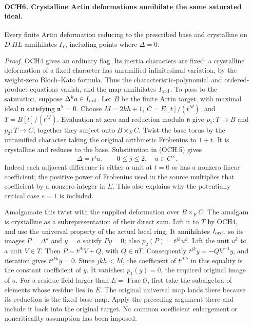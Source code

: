 \paragraph{OCH6. Crystalline Artin deformations annihilate the same saturated ideal.}
\label{claim:OCH6}
Every finite Artin deformation reducing to the prescribed base and
crystalline on \(D.HL\) annihilates \(I_Y\), including points
where \(\Delta=0\).

\emph{Proof.}
OCH4 gives an ordinary flag.  Its inertia characters are fixed:
a crystalline deformation of a fixed character has unramified
infinitesimal variation, by the weight-zero Bloch--Kato formula.
Thus the characteristic-polynomial and ordered-product equations
vanish, and the map annihilates \(I_{\rm ord}\).
To pass to the saturation, suppose \(\Delta^k a\in I_{\rm ord}\).
Let \(B\) be the finite Artin target, with maximal ideal
\(\mathfrak n\) satisfying \(\mathfrak n^h=0\).
Choose \(M=2kh+1\),
\(C=E[t]/(t^M)\), and \(T=B[t]/(t^M)\).
Evaluation at zero and reduction modulo \(\mathfrak n\) give
\(p_1:T\to B\) and \(p_2:T\to C\); together they surject onto
\(B\times_E C\).
Twist the base torus by the unramified character taking the original
arithmetic Frobenius to \(1+t\).  It is crystalline and reduces
to the base.  Substitution in (OCH.5) gives
\[
                   \Delta=t^j u,\qquad 0\le j\le2,
                       \quad u\in C^\times.
 \tag{OCH.6}
\]
Indeed each adjacent difference is either a unit at \(t=0\)
or has a nonzero linear coefficient; the positive power of
Frobenius used in the source multiplies that coefficient by a
nonzero integer in \(E\).  This also explains why the potentially
critical case \(e=1\) is included.

Amalgamate this twist with the supplied deformation over
\(B\times_E C\).  The amalgam is crystalline as a
subrepresentation of their direct sum.  Lift it to \(T\) by
OCH4, and use the universal property of the actual local ring.
It annihilates \(I_{\rm ord}\), so its images \(P=\Delta^k\)
and \(y=a\) satisfy \(Py=0\); also
\(p_2(P)=t^{jk}u^k\).  Lift the unit \(u^k\) to a unit
\(V\in T\).  Then \(P=t^{jk}V+Q\), with
\(Q\in\mathfrak nT\).  Consequently
\(t^{jk}y=-QV^{-1}y\), and iteration gives
\(t^{jkh}y=0\).  Since \(jkh<M\), the coefficient of
\(t^{jkh}\) in this equality is the constant coefficient of
\(y\).  It vanishes: \(p_1(y)=0\), the required original
image of \(a\).
For a residue field larger than \(E=\operatorname{Frac}\mathcal O\),
first take the subalgebra of elements whose residue lies in \(E\).
The original universal map lands there because its reduction is the
fixed base map.  Apply the preceding argument there and include it
back into the original target.  No common coefficient enlargement
or noncriticality assumption has been imposed.

